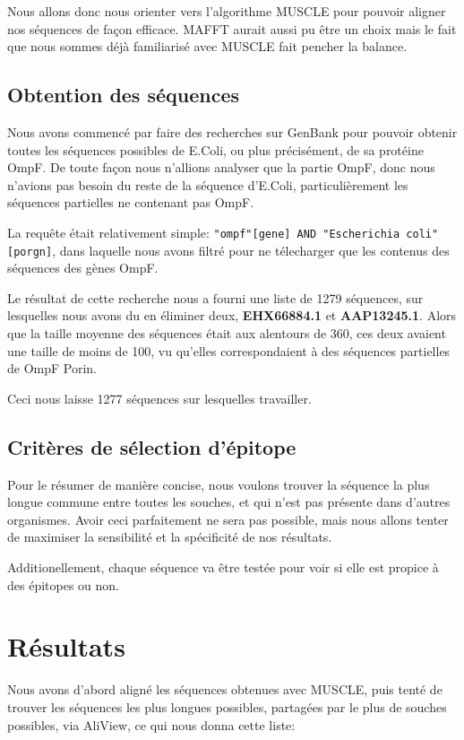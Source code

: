 \documentclass{article}
\begin{document}
    Nous allons donc nous orienter vers l'algorithme MUSCLE pour pouvoir aligner nos séquences de façon efficace. MAFFT aurait aussi pu être un choix mais le fait que nous sommes déjà familiarisé avec MUSCLE fait pencher la balance. \cite{yoann:Online}

    \subsection{Obtention des séquences}
      Nous avons commencé par faire des recherches sur GenBank pour pouvoir obtenir toutes les séquences possibles de E.Coli, ou plus précisément, de sa protéine OmpF. De toute façon nous n'allions analyser que la partie OmpF, donc nous n'avions pas besoin du reste de la séquence d'E.Coli, particulièrement les séquences partielles ne contenant pas OmpF.

      La requête était relativement simple: \texttt{"ompf"[gene] AND "Escherichia coli"[porgn]}, dans laquelle nous avons filtré pour ne télecharger que les contenus des séquences des gènes OmpF.

      Le résultat de cette recherche nous a fourni une liste de 1279 séquences, sur lesquelles nous avons du en éliminer deux, \textbf{EHX66884.1} et \textbf{AAP13245.1}. Alors que la taille moyenne des séquences était aux alentours de 360, ces deux avaient une taille de moins de 100, vu qu'elles correspondaient à des séquences partielles de OmpF Porin.

      Ceci nous laisse 1277 séquences sur lesquelles travailler.

    \subsection{Critères de sélection d'épitope}
      Pour le résumer de manière concise, nous voulons trouver la séquence la plus longue commune entre toutes les souches, et qui n'est pas présente dans d'autres organismes. Avoir ceci parfaitement ne sera pas possible, mais nous allons tenter de maximiser la sensibilité et la spécificité de nos résultats.

      Additionellement, chaque séquence va être testée pour voir si elle est propice à des épitopes ou non.

  \section{Résultats}
    Nous avons d'abord aligné les séquences obtenues avec MUSCLE, puis tenté de trouver les séquences les plus longues possibles, partagées par le plus de souches possibles, via AliView, ce qui nous donna cette liste:
\end{document}
